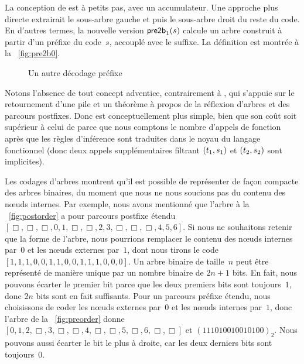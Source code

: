La conception de  est à petits
pas, avec un accumulateur. Une approche plus directe extrairait le
sous-arbre gauche et puis le sous-arbre droit du reste du code. En
d'autres termes, la nouvelle version
\(\textsf{pre2b}_1(s)\) calcule un
arbre construit à partir d'un préfixe du code~\(s\), accouplé avec le
suffixe. La définition est montrée à la \fig~\vref{fig:pre2b0}.
\begin{figure}
\abovedisplayskip=0pt
\belowdisplayskip=0pt
\centering
{}
\caption{Un autre décodage préfixe\label{fig:pre2b0}}
\end{figure}
Notons l'absence de tout concept adventice, contrairement à
, qui s'appuie sur le
retournement d'une pile et un théorème à
propos de la réflexion d'arbres et des parcours postfixes. Donc
 est
conceptuellement plus simple, bien que son coût soit supérieur à celui
de  parce que nous comptons le
nombre d'appels de fonction après que les règles
d'inférence sont traduites dans le noyau du
langage fonctionnel (donc deux appels supplémentaires filtrant
\(({t_1},{s_1})\) et \(({t_2},{s_2})\) sont implicites).

Les codages d'arbres montrent qu'il est possible de représenter de
façon compacte des arbres binaires, du moment que nous ne nous
soucions pas du contenu des n{\oe}uds internes. Par exemple, nous
avons mentionné que l'arbre à la \fig~\vref{fig:postorder} a pour
parcours postfixe étendu
\([\Box, \Box, \Box, 0, 1, \Box, \Box, 2, 3, \Box, \Box, \Box, 4, 5,
6]\). Si nous ne souhaitons retenir que la forme de l'arbre, nous
pourrions remplacer le contenu des n{\oe}uds internes par~\(0\) et les
n{\oe}uds externes par~\(1\), dont nous tirons le code
\([1,1,1,0,0,1,1,0,0,1,1,1,0,0,0]\). Un arbre binaire de taille~\(n\)
peut être représenté de manière unique par un nombre binaire de
\(2n+1\) bits. En fait, nous pouvons écarter le premier bit parce que
les deux premiers bits sont toujours~\(1\), donc \(2n\) bits sont en
fait suffisants. Pour un parcours préfixe étendu, nous choisissons de
coder les n{\oe}uds externes par~\(0\) et les n{\oe}uds internes
par~\(1\), donc l'arbre de la \fig~\vref{fig:preorder} donne \([0, 1,
2, \Box, 3, \Box, \Box, 4, \Box, \Box, 5, \Box, 6, \Box, \Box]\) et
\((111010010010100)_2\). Nous pouvons aussi écarter le bit le plus à
droite, car les deux derniers bits sont toujours~\(0\).

